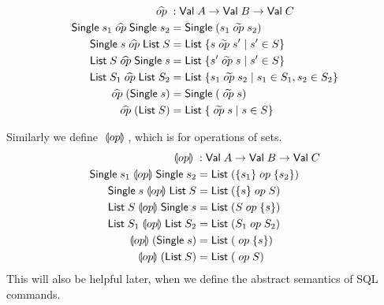 \begin{align}
    \aop &: \mathsf{Val} \; A \rightarrow \mathsf{Val} \; B \rightarrow \mathsf{Val} \; C \label{eq:operation} \\
    \mathsf{Single} \; s_1 \aop \mathsf{Single} \; s_2 &= \mathsf{Single} \; (s_1 \aaop s_2) \label{eq:generalBOP} \\
    \mathsf{Single} \; s \aop \mathsf{List} \; S &= \mathsf{List} \; \{ s \aaop s' \mid s' \in S \} \\
    \mathsf{List} \; S \aop \mathsf{Single} \; s &= \mathsf{List} \; \{ s' \aaop s \mid s' \in S \}  \\
    \mathsf{List} \; S_1 \aop \mathsf{List} \; S_2 &= \mathsf{List} \; \{ s_1 \aaop s_2 \mid s_1 \in S_1, s_2 \in S_2 \} \\
    \aop (\mathsf{Single} \; s) &= \mathsf{Single} \; (\aaop s) \\
    \aop (\mathsf{List} \; S) &= \mathsf{List} \; \{ \aaop s \mid s \in S \} \label{eq:generalUOP}
\end{align}

Similarly we define $\;\llparenthesis op\rrparenthesis\;$, which is for operations of sets.
\begin{align}
    \;\llparenthesis op\rrparenthesis\; &: \mathsf{Val} \; A \rightarrow \mathsf{Val} \; B \rightarrow \mathsf{Val} \; C \\
    \mathsf{Single} \; s_1 \;\llparenthesis op\rrparenthesis\; \mathsf{Single} \; s_2 &= \mathsf{List} \; (\{s_1\} \;op\; \{s_2\}) \\
    \mathsf{Single} \; s \;\llparenthesis op\rrparenthesis\; \mathsf{List} \; S &= \mathsf{List} \; (\{ s \} \;op\; S) \\
    \mathsf{List} \; S \;\llparenthesis op\rrparenthesis\; \mathsf{Single} \; s &= \mathsf{List} \; (S \;op\; \{ s \})  \\
    \mathsf{List} \; S_1 \;\llparenthesis op\rrparenthesis\; \mathsf{List} \; S_2 &= \mathsf{List} \; (S_1 \;op\; S_2) \\
    \;\llparenthesis op\rrparenthesis\; (\mathsf{Single} \; s) &= \mathsf{List} \; (\;op\; \{ s \}) \\
    \;\llparenthesis op\rrparenthesis\; (\mathsf{List} \; S) &= \mathsf{List} \; (\;op\; S )
\end{align}
This will also be helpful later, when we define the abstract semantics of SQL commands.

